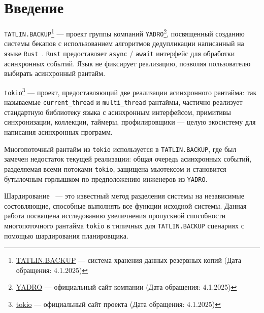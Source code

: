 
\section*{Введение}
\thispagestyle{withCompileDate}

\verb|TATLIN.BACKUP|\footnote{\href{https://yadro.com/ru/tatlin/backup}{TATLIN.BACKUP}
--- система хранения данных резервных копий (Дата обращения: 4.1.2025)} --- проект группы компаний \verb|YADRO|\footnote{\href{https://yadro.com/}{YADRO} --- официальный сайт компании (Дата обращения: 4.1.2025)}, посвященный созданию системы бекапов с использованием алгоритмов дедупликации написанный на языке \verb|Rust|~\cite{RustCommunity}. \verb|Rust| предоставляет \verb|async| / \verb|await|\cite{fsharpasyncawait} интерфейс для обработки асинхронных событий. Язык не фиксирует реализацию, позволяя пользователю выбирать асинхронный рантайм.

\verb|tokio|\footnote{\href{https://tokio.rs/}{tokio} --- официальный сайт проекта (Дата обращения: 4.1.2025)} --- проект, предоставляющий две реализации асинхронного рантайма: так называемые \verb|current_thread| и \verb|multi_thread| рантаймы, частично реализует стандартную библиотеку языка с асинхронным интерфейсом, примитивы синхронизации, коллекции, таймеры, профилировщики --- целую экосистему для написания асинхронных программ.

Многопоточный рантайм из \verb|tokio| используется в \verb|TATLIN.BACKUP|, где был замечен недостаток текущей реализации: общая очередь асинхронных событий, разделяемая всеми потоками \verb|tokio|, защищена мьютексом и становится бутылочным горлышком по предположению инженеров из \verb|YADRO|.

Шардирование~\cite{ShardingCriticalReview} --- это известный метод разделения системы на независимые состовляющие, способные выполнять все функции исходной системы. Данная работа посвящена исследованию увеличнения пропускной способности многопоточного рантайма \verb|tokio| в типичных для \verb|TATLIN.BACKUP| сценариях с помощью шардирования планировщика.
